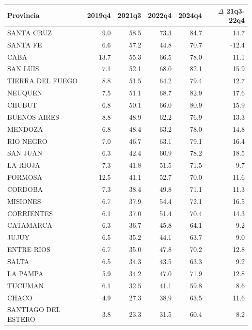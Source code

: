 \begin{tabular}{lrrrrr}
\toprule
Provincia & 2019q4 & 2021q3 & 2022q4 & 2024q4 & $\Delta$ 21q3-22q4 \\
\midrule
SANTA CRUZ&9.0&58.5&73.3&84.7&14.7\\
SANTA FE&6.6&57.2&44.8&70.7&-12.4\\
CABA&13.7&55.3&66.5&78.0&11.1\\
SAN LUIS&7.1&52.1&68.0&82.1&15.9\\
TIERRA DEL FUEGO&8.8&51.5&64.2&79.4&12.7\\
NEUQUEN&7.5&51.1&68.7&82.9&17.6\\
CHUBUT&6.8&50.1&66.0&80.9&15.9\\
BUENOS AIRES&8.8&48.9&62.2&76.9&13.3\\
MENDOZA&6.8&48.4&63.2&78.0&14.8\\
RIO NEGRO&7.0&46.7&63.1&79.1&16.4\\
SAN JUAN&6.3&42.4&60.9&78.2&18.5\\
LA RIOJA&7.3&41.8&51.5&71.5&9.7\\
FORMOSA&12.5&41.1&52.7&70.0&11.6\\
CORDOBA&7.3&38.4&49.8&71.1&11.3\\
MISIONES&6.7&37.9&54.4&72.1&16.5\\
CORRIENTES&6.1&37.0&51.4&70.4&14.3\\
CATAMARCA&6.3&36.7&45.8&64.1&9.2\\
JUJUY&6.5&35.2&44.1&63.7&9.0\\
ENTRE RIOS&6.7&35.0&47.8&70.2&12.8\\
SALTA&6.5&34.3&43.5&63.3&9.2\\
LA PAMPA&5.9&34.2&47.0&71.9&12.8\\
TUCUMAN&6.1&32.5&41.1&59.8&8.6\\
CHACO&4.9&27.3&38.9&63.5&11.6\\
SANTIAGO DEL ESTERO&3.8&23.3&31.5&60.4&8.2\\
\bottomrule
\end{tabular}
